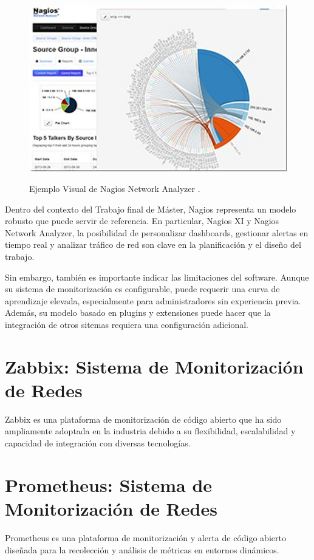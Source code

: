 \begin{figure}[H]
    \centering
    {\includegraphics[width=0.7\linewidth]{imagenes/image5.png}}
    \caption{Ejemplo Visual de Nagios Network Analyzer \citep{nagios2014}.}
    \label{fig:enter-label}
\end{figure}

Dentro del contexto del Trabajo final de Máster, Nagios representa un modelo robusto que puede servir de referencia. En particular, Nagios XI y Nagios Network Analyzer, la posibilidad de personalizar dashboards, gestionar alertas en tiempo real y analizar tráfico de red son clave en la planificación y el diseño del trabajo.

Sin embargo, también es importante indicar las limitaciones del software. Aunque su sistema de monitorización es configurable, puede requerir una curva de aprendizaje elevada, especialmente para administradores sin experiencia previa. Además, su modelo basado en plugins y extensiones puede hacer que la integración de otros sitemas requiera una configuración adicional.

\section{Zabbix: Sistema de Monitorización de Redes}
Zabbix es una plataforma de monitorización de código abierto que ha sido ampliamente adoptada en la industria debido a su flexibilidad, escalabilidad y capacidad de integración con diversas tecnologías.


\section{Prometheus: Sistema de Monitorización de Redes}
Prometheus es una plataforma de monitorización y alerta de código abierto diseñada para la recolección y análisis de métricas en entornos dinámicos.

